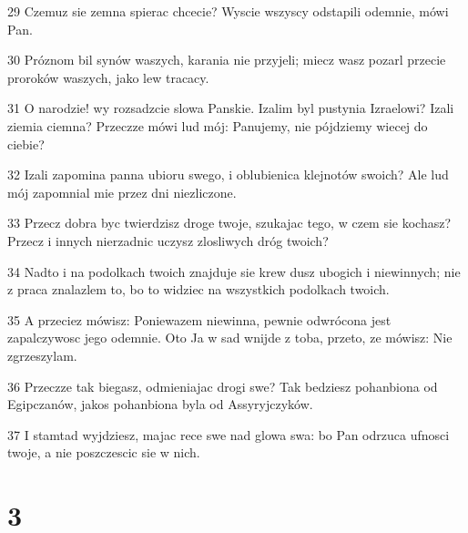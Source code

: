\par 29 Czemuz sie zemna spierac chcecie? Wyscie wszyscy odstapili odemnie, mówi Pan.
\par 30 Próznom bil synów waszych, karania nie przyjeli; miecz wasz pozarl przecie proroków waszych, jako lew tracacy.
\par 31 O narodzie! wy rozsadzcie slowa Panskie. Izalim byl pustynia Izraelowi? Izali ziemia ciemna? Przeczze mówi lud mój: Panujemy, nie pójdziemy wiecej do ciebie?
\par 32 Izali zapomina panna ubioru swego, i oblubienica klejnotów swoich? Ale lud mój zapomnial mie przez dni niezliczone.
\par 33 Przecz dobra byc twierdzisz droge twoje, szukajac tego, w czem sie kochasz? Przecz i innych nierzadnic uczysz zlosliwych dróg twoich?
\par 34 Nadto i na podolkach twoich znajduje sie krew dusz ubogich i niewinnych; nie z praca znalazlem to, bo to widziec na wszystkich podolkach twoich.
\par 35 A przeciez mówisz: Poniewazem niewinna, pewnie odwrócona jest zapalczywosc jego odemnie. Oto Ja w sad wnijde z toba, przeto, ze mówisz: Nie zgrzeszylam.
\par 36 Przeczze tak biegasz, odmieniajac drogi swe? Tak bedziesz pohanbiona od Egipczanów, jakos pohanbiona byla od Assyryjczyków.
\par 37 I stamtad wyjdziesz, majac rece swe nad glowa swa: bo Pan odrzuca ufnosci twoje, a nie poszczescic sie w nich.

\chapter{3}

